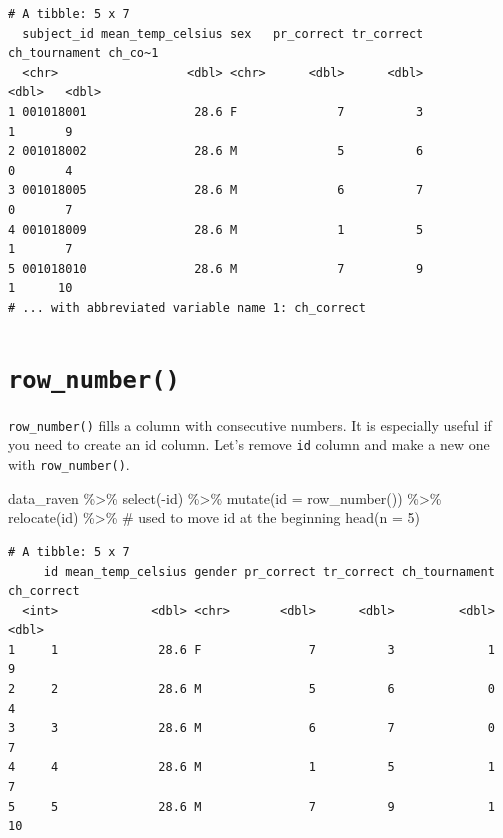 \documentclass[
  letterpaper,
]{book}
\newenvironment{Shaded}{\begin{snugshade}}{\end{snugshade}}
\newcommand{\AttributeTok}[1]{\textcolor[rgb]{0.40,0.45,0.13}{#1}}
\newcommand{\CommentTok}[1]{\textcolor[rgb]{0.37,0.37,0.37}{#1}}
\newcommand{\DecValTok}[1]{\textcolor[rgb]{0.68,0.00,0.00}{#1}}
\newcommand{\FunctionTok}[1]{\textcolor[rgb]{0.28,0.35,0.67}{#1}}
\newcommand{\NormalTok}[1]{\textcolor[rgb]{0.00,0.23,0.31}{#1}}
\newcommand{\SpecialCharTok}[1]{\textcolor[rgb]{0.37,0.37,0.37}{#1}}
\begin{document}
\begin{verbatim}
# A tibble: 5 x 7
  subject_id mean_temp_celsius sex   pr_correct tr_correct ch_tournament ch_co~1
  <chr>                  <dbl> <chr>      <dbl>      <dbl>         <dbl>   <dbl>
1 001018001               28.6 F              7          3             1       9
2 001018002               28.6 M              5          6             0       4
3 001018005               28.6 M              6          7             0       7
4 001018009               28.6 M              1          5             1       7
5 001018010               28.6 M              7          9             1      10
# ... with abbreviated variable name 1: ch_correct
\end{verbatim}

\hypertarget{row_number}{%
\section{\texorpdfstring{\texttt{row\_number()}}{row\_number()}}\label{row_number}}

\texttt{row\_number()} fills a column with consecutive numbers. It is
especially useful if you need to create an id column. Let's remove
\texttt{id} column and make a new one with \texttt{row\_number()}.

\begin{Shaded}
\begin{Highlighting}[]
\NormalTok{data\_raven }\SpecialCharTok{\%\textgreater{}\%} 
  \FunctionTok{select}\NormalTok{(}\SpecialCharTok{{-}}\NormalTok{id) }\SpecialCharTok{\%\textgreater{}\%}
  \FunctionTok{mutate}\NormalTok{(}\AttributeTok{id =} \FunctionTok{row\_number}\NormalTok{()) }\SpecialCharTok{\%\textgreater{}\%} 
  \FunctionTok{relocate}\NormalTok{(id) }\SpecialCharTok{\%\textgreater{}\%} \CommentTok{\# used to move id at the beginning}
  \FunctionTok{head}\NormalTok{(}\AttributeTok{n =} \DecValTok{5}\NormalTok{)}
\end{Highlighting}
\end{Shaded}

\begin{verbatim}
# A tibble: 5 x 7
     id mean_temp_celsius gender pr_correct tr_correct ch_tournament ch_correct
  <int>             <dbl> <chr>       <dbl>      <dbl>         <dbl>      <dbl>
1     1              28.6 F               7          3             1          9
2     2              28.6 M               5          6             0          4
3     3              28.6 M               6          7             0          7
4     4              28.6 M               1          5             1          7
5     5              28.6 M               7          9             1         10
\end{verbatim}
\end{document}
